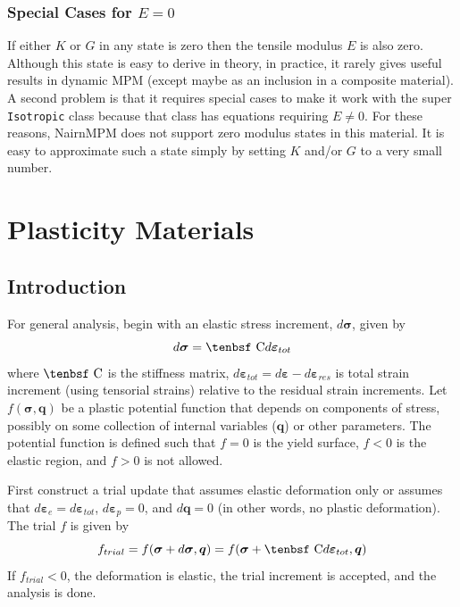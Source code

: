 \documentclass[11pt]{book}
\renewcommand{\vec}[1]{\boldsymbol{#1}}
\def\C{\hbox{\tenbsf C}}
\def\code#1{{\small\tt #1}}
\def\del{d \vec{\varepsilon}_{e}}
\def\dpl{d \vec{\varepsilon}_{p}}
\def\deff{d \vec{\varepsilon}_{tot}}
\def\dsig{d \vec{\sigma}}
\begin{document}
\subsection{Special Cases for $E=0$}

If either $K$ or $G$ in any state is zero then the tensile modulus $E$ is also zero. Although this state is easy to derive in theory, in practice, it rarely gives useful results in dynamic MPM (except maybe as an inclusion in a composite material). A second problem is that it requires special cases to make it work with the super \code{Isotropic} class because that class has equations requiring $E\ne 0$. For these reasons, NairnMPM does not support zero modulus states in this material. It is easy to approximate such a state simply by setting $K$ and/or $G$ to a very small number.

\chapter{Plasticity Materials}

\section{Introduction}

For general analysis, begin with an elastic stress increment, $\dsig$, given by
\begin{equation}
    \dsig = \C \deff 
\end{equation}
where $\C$ is the stiffness matrix, $\deff=d\vec\varepsilon-d\vec\varepsilon_{res}$ is total strain increment (using tensorial strains) relative to the residual strain increments. Let $f(\vec{\sigma},\vec q)$ be a plastic potential function that depends on components of stress, possibly on some collection of internal variables ($\vec q$) or other parameters. The potential function is defined such that $f=0$ is the yield surface, $f<0$ is the elastic region, and $f>0$ is not allowed.

First construct a trial update that assumes elastic deformation only or assumes that $\del=\deff$, $\dpl=0$, and $d\vec q=0$ (in other words, no plastic deformation). The trial $f$ is given by\begin{equation}
       f_{trial} = f(\vec\sigma + \dsig,\vec q) = f(\vec\sigma + \C \deff ,\vec q)
\end{equation}
If $f_{trial}<0$, the deformation is elastic, the trial increment is accepted, and the analysis is done.
\end{document}
